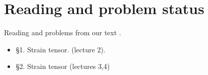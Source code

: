 \chapter{Reading and problem status}

Reading and problems from our text \cite{}.

\begin{itemize}
\item \cite{landau1960theory} \S 1.  Strain tensor. (lecture 2).
\item \S 2.  Strain tensor (lectures 3,4)
\end{itemize}

